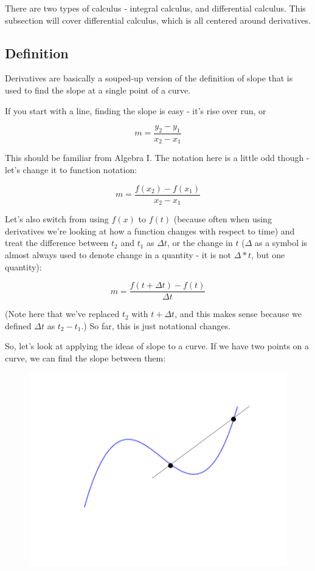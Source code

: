 There are two types of calculus - integral calculus, and differential calculus. This subsection will cover differential calculus, which is all centered around derivatives.

\subsection{Definition}
Derivatives are basically a souped-up version of the definition of slope that is used to find the slope at a single point of a curve.

If you start with a line, finding the slope is easy - it's rise over run, or

\begin{equation*}
    m = \frac{y_2-y_1}{x_2-x_1}
\end{equation*}

This should be familiar from Algebra I. The notation here is a little odd though - let's change it to function notation:

\begin{equation*}
    m = \frac{f(x_2) - f(x_1)}{x_2-x_1}
\end{equation*}

Let's also switch from using $f(x)$ to $f(t)$ (because often when using derivatives we're looking at how a function changes with respect to time) and treat the difference between $t_2$ and $t_1$ as $\Delta t$, or the change in $t$ ($\Delta$ as a symbol is almost always used to denote change in a quantity - it is not $\Delta * t$, but one quantity):

\begin{equation*}
    m = \frac{f(t + \Delta t) - f(t)}{\Delta t}
\end{equation*}

(Note here that we've replaced $t_2$ with $t+\Delta t$, and this makes sense because we defined $\Delta t$ as $t_2 - t_1$.) So far, this is just notational changes.

So, let's look at applying the ideas of slope to a curve. If we have two points on a curve, we can find the slope between them:

\begin{figure}[H]
    \centering
    \includegraphics[scale=.15]{diagram1}
\end{figure}

